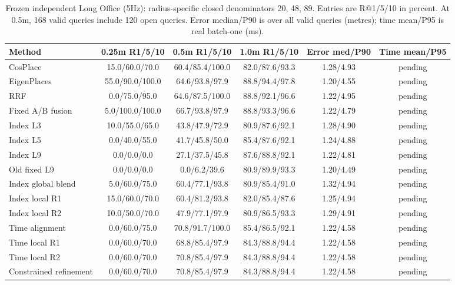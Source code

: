 \documentclass[conference,letterpaper]{IEEEtran}
\begin{document}
\begin{table}[t]
\centering\caption{Frozen independent Long Office (5Hz): radius-specific closed denominators 20, 48, 89. Entries are R@1/5/10 in percent. At 0.5m, 168 valid queries include 120 open queries. Error median/P90 is over all valid queries (metres); time mean/P95 is real batch-one (ms).}
\label{tab:test}
\scriptsize\setlength{\tabcolsep}{5pt}
\begin{tabular}{lccccc}\hline
Method & 0.25m R1/5/10 & 0.5m R1/5/10 & 1.0m R1/5/10 & Error med/P90 & Time mean/P95\\\hline
CosPlace & 15.0/60.0/70.0 & 60.4/85.4/100.0 & 82.0/87.6/93.3 & 1.28/4.93 & pending \\
EigenPlaces & 55.0/90.0/100.0 & 64.6/93.8/97.9 & 88.8/94.4/97.8 & 1.20/4.55 & pending \\
RRF & 0.0/75.0/95.0 & 64.6/87.5/100.0 & 88.8/92.1/96.6 & 1.22/4.95 & pending \\
Fixed A/B fusion & 5.0/100.0/100.0 & 66.7/93.8/97.9 & 88.8/93.3/96.6 & 1.22/4.79 & pending \\
Index L3 & 10.0/55.0/65.0 & 43.8/47.9/72.9 & 80.9/87.6/92.1 & 1.28/4.90 & pending \\
Index L5 & 0.0/40.0/55.0 & 41.7/45.8/50.0 & 85.4/87.6/92.1 & 1.24/4.88 & pending \\
Index L9 & 0.0/0.0/0.0 & 27.1/37.5/45.8 & 87.6/88.8/92.1 & 1.22/4.81 & pending \\
Old fixed L9 & 0.0/0.0/0.0 & 0.0/6.2/39.6 & 80.9/89.9/93.3 & 1.20/4.49 & pending \\
Index global blend & 5.0/60.0/75.0 & 60.4/77.1/93.8 & 80.9/85.4/91.0 & 1.32/4.94 & pending \\
Index local R1 & 15.0/60.0/70.0 & 60.4/81.2/93.8 & 82.0/85.4/87.6 & 1.25/4.94 & pending \\
Index local R2 & 10.0/50.0/70.0 & 47.9/77.1/97.9 & 80.9/86.5/93.3 & 1.29/4.91 & pending \\
Time alignment & 0.0/60.0/75.0 & 70.8/91.7/100.0 & 85.4/86.5/92.1 & 1.22/4.58 & pending \\
Time local R1 & 0.0/60.0/70.0 & 68.8/85.4/97.9 & 84.3/88.8/94.4 & 1.22/4.58 & pending \\
Time local R2 & 0.0/60.0/70.0 & 70.8/85.4/97.9 & 84.3/88.8/94.4 & 1.22/4.58 & pending \\
Constrained refinement & 0.0/60.0/70.0 & 70.8/85.4/97.9 & 84.3/88.8/94.4 & 1.22/4.58 & pending \\
\hline\end{tabular}\end{table}
\end{document}
